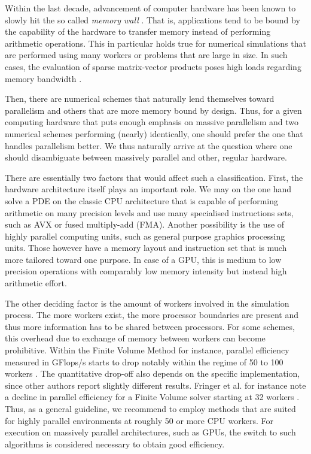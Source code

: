 \documentclass[sn-mathphys,Numbered]{sn-jnl}%
\theoremstyle{thmstyleone}%
\theoremstyle{thmstyletwo}%
\theoremstyle{thmstylethree}%
\begin{document}
Within the last decade, advancement of computer hardware has been known to slowly hit the so called \textit{memory wall} \cite{mckeeMemoryWall2011}.
That is, applications tend to be bound by the capability of the hardware to transfer memory instead of performing arithmetic operations.
This in particular holds true for numerical simulations that are performed using many workers or problems that are large in size.
In such cases, the evaluation of sparse matrix-vector products poses high loads regarding memory bandwidth \cite{arndtExaDGHighOrderDiscontinuous2020}.

Then, there are numerical schemes that naturally lend themselves toward parallelism and others that are more memory bound by design.
Thus, for a given computing hardware that puts enough emphasis on massive parallelism and two numerical schemes performing (nearly) identically, one should prefer the one that handles parallelism better.
We thus naturally arrive at the question where one should disambiguate between massively parallel and other, regular hardware.

There are essentially two factors that would affect such a classification.
First, the hardware architecture itself plays an important role.
We may on the one hand solve a PDE on the classic CPU architecture that is capable of performing arithmetic on many precision levels and use many specialised instructions sets, such as AVX or fused multiply-add (FMA).
Another possibility is the use of highly parallel computing units, such as general purpose graphics processing units.
Those however have a memory layout and instruction set that is much more tailored toward one purpose.
In case of a GPU, this is medium to low precision operations with comparably low memory intensity but instead high arithmetic effort.

The other deciding factor is the amount of workers involved in the simulation process.
The more workers exist, the more processor boundaries are present and thus more information has to be shared between processors.
For some schemes, this overhead due to exchange of memory between workers can become prohibitive.
Within the Finite Volume Method for instance, parallel efficiency measured in GFlops/s starts to drop notably within the regime of 50 to 100 workers \cite{marshallFinitevolumeIncompressibleNavier1997}.
The quantitative drop-off also depends on the specific implementation, since other authors report slightly different results. 
Fringer et al. for instance note a decline in parallel efficiency for a Finite Volume solver starting at 32 workers \cite{fringerUnstructuredgridFinitevolumeNonhydrostatic2006}.
Thus, as a general guideline, we recommend to employ methods that are suited for highly parallel environments at roughly 50 or more CPU workers.
For execution on massively parallel architectures, such as GPUs, the switch to such algorithms is considered necessary to obtain good efficiency.
\end{document}
